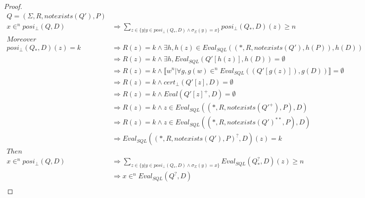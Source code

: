 \begin{proof}
	\begin{align*}
		Q = (\Sigma,R,notexists(Q'),P) \\
		x \in^n posi_\bot(Q,D) & \Rightarrow \sum_{z \in \{y | y \in posi_\bot(Q_*,D) \land \sigma_\Sigma(y) = x \} }{posi_\bot(Q_*,D)(z)} \geq n \\
		Moreover\\
		posi_\bot(Q_*,D)(z)  = k  & \Rightarrow  R(z) = k \land \exists h, h(z) \in  Eval_{SQL}((*,R,notexists(Q'),h(P)),h(D)) \\
		& \Rightarrow  R(z) = k \land  \exists h, Eval_{SQL}(Q'[h(z)],h(D)) = \emptyset \\
		&  \Rightarrow  R(z) = k \land  \llbracket w^n| \forall g, g(w) \in^n Eval_{SQL}((Q'[g(z)]),g(D)) \rrbracket = \emptyset \\ 
		&  \Rightarrow  R(z) = k \land  cert_\bot(Q'[z],D) = \emptyset \\
		&  \Rightarrow  R(z) = k \land  Eval(Q'[z]^+,D) = \emptyset \\
		&  \Rightarrow  R(z) = k \land z \in Eval_{SQL}((*,R,notexists(Q'^+),P),D) \\
		&  \Rightarrow  R(z) = k \land z \in Eval_{SQL}((*,R,notexists(Q')^{**},P),D) \\
		&  \Rightarrow  Eval_{SQL}((*,R,notexists(Q'),P)^?,D)(z) = k \\
		Then \\
		x \in^n posi_\bot(Q,D) &\Rightarrow  \sum_{z \in \{y | y \in posi_\bot(Q_*,D) \land \sigma_\Sigma(y) = x \} }{Eval_{SQL}(Q_*^?,D)(z)} \geq n \\
		& \Rightarrow x \in^n Eval_{SQL}(Q^?,D) \\
	\end{align*}
	

\end{proof}

